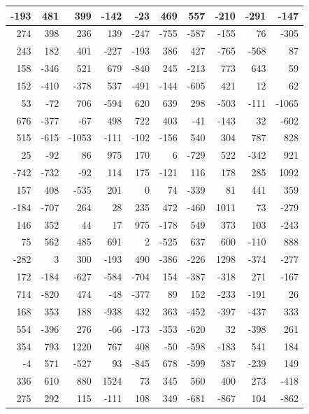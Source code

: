 \documentclass[
]{book}
\begin{document}
\begin{tabular}{r|r|r|r|r|r|r|r|r|r}
\hline
-193 & 481 & 399 & -142 & -23 & 469 & 557 & -210 & -291 & -147\\
\hline
274 & 398 & 236 & 139 & -247 & -755 & -587 & -155 & 76 & -305\\
\hline
243 & 182 & 401 & -227 & -193 & 386 & 427 & -765 & -568 & 87\\
\hline
158 & -346 & 521 & 679 & -840 & 245 & -213 & 773 & 643 & 59\\
\hline
152 & -410 & -378 & 537 & -491 & -144 & -605 & 421 & 12 & 62\\
\hline
53 & -72 & 706 & -594 & 620 & 639 & 298 & -503 & -111 & -1065\\
\hline
676 & -377 & -67 & 498 & 722 & 403 & -41 & -143 & 32 & -602\\
\hline
515 & -615 & -1053 & -111 & -102 & -156 & 540 & 304 & 787 & 828\\
\hline
25 & -92 & 86 & 975 & 170 & 6 & -729 & 522 & -342 & 921\\
\hline
-742 & -732 & -92 & 114 & 175 & -121 & 116 & 178 & 285 & 1092\\
\hline
157 & 408 & -535 & 201 & 0 & 74 & -339 & 81 & 441 & 359\\
\hline
-184 & -707 & 264 & 28 & 235 & 472 & -460 & 1011 & 73 & -279\\
\hline
146 & 352 & 44 & 17 & 975 & -178 & 549 & 373 & 103 & -243\\
\hline
75 & 562 & 485 & 691 & 2 & -525 & 637 & 600 & -110 & 888\\
\hline
-282 & 3 & 300 & -193 & 490 & -386 & -226 & 1298 & -374 & -277\\
\hline
172 & -184 & -627 & -584 & -704 & 154 & -387 & -318 & 271 & -167\\
\hline
714 & -820 & 474 & -48 & -377 & 89 & 152 & -233 & -191 & 26\\
\hline
168 & 353 & 188 & -938 & 432 & 363 & -452 & -397 & -437 & 333\\
\hline
554 & -396 & 276 & -66 & -173 & -353 & -620 & 32 & -398 & 261\\
\hline
354 & 793 & 1220 & 767 & 408 & -50 & -598 & -183 & 541 & 184\\
\hline
-4 & 571 & -527 & 93 & -845 & 678 & -599 & 587 & -239 & 149\\
\hline
336 & 610 & 880 & 1524 & 73 & 345 & 560 & 400 & 273 & -418\\
\hline
275 & 292 & 115 & -111 & 108 & 349 & -681 & -867 & 104 & -862\\

\end{tabular}
\end{document}
